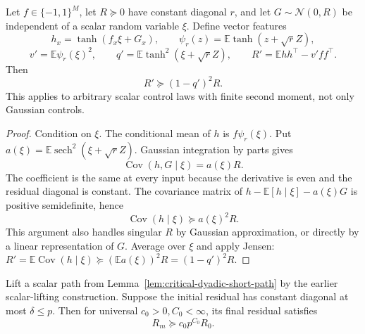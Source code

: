 \begin{lemma}
\label{lem:critical-residual-spectral}
Let $f\in\{-1,1\}^M$, let $R\succeq0$ have constant diagonal $r$,
and let $G\sim\mathcal N(0,R)$ be independent of a scalar random
variable $\xi$. Define vector features
\[
 h_x=\tanh(f_x\xi+G_x),\qquad
 \psi_r(z)=\mathbb E\tanh(z+\sqrt r Z),
\]
\[
 v'=\mathbb E\psi_r(\xi)^2,\qquad
 q'=\mathbb E\tanh^2(\xi+\sqrt r Z),\qquad
 R'=\mathbb Ehh^\top-v'ff^\top.
\]
Then
\begin{equation}\label{eq:critical-residual-spectral-bound}
 R'\succeq(1-q')^2R.
\end{equation}
This applies to arbitrary scalar control laws with finite second moment,
not only Gaussian controls.
\end{lemma}

\begin{proof}
Condition on $\xi$. The conditional mean of $h$ is $f\psi_r(\xi)$.
Put $a(\xi)=\mathbb E\operatorname{sech}^2(\xi+\sqrt rZ)$.
Gaussian integration by parts gives
\[
 \operatorname{Cov}(h,G\mid\xi)=a(\xi)R.
\]
The coefficient is the same at every input because the derivative is
even and the residual diagonal is constant. The covariance matrix of
$h-\mathbb E[h\mid\xi]-a(\xi)G$ is positive semidefinite, hence
\[
 \operatorname{Cov}(h\mid\xi)\succeq a(\xi)^2R.
\]
This argument also handles singular $R$ by Gaussian approximation, or
directly by a linear representation of $G$.
Average over $\xi$ and apply Jensen:
$R'=\mathbb E\operatorname{Cov}(h\mid\xi)
\succeq(\mathbb Ea(\xi))^2R=(1-q')^2R$.
\end{proof}

\begin{corollary}
\label{cor:critical-polynomial-residual-loss}
Lift a scalar path from Lemma~\ref{lem:critical-dyadic-short-path} by
the earlier scalar-lifting construction. Suppose the initial residual
has constant diagonal at most $\delta\le p$. Then for universal
$c_0>0,C_0<\infty$, its final residual satisfies
\[
 R_m\succeq c_0p^{C_0}R_0.
\]
\end{corollary}

